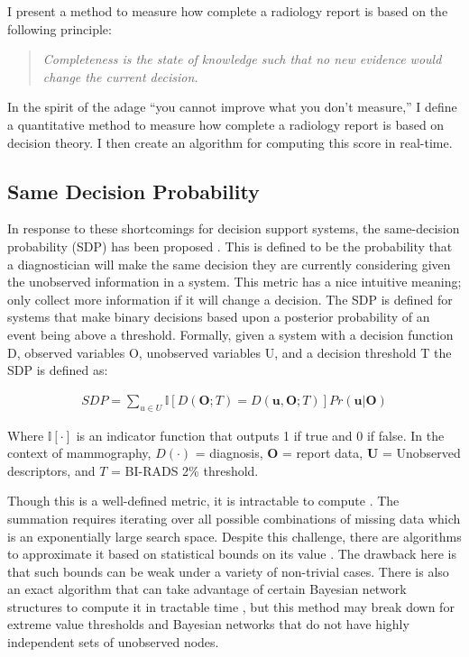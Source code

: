 I present a method to measure how complete a radiology report is based on the following principle:

\begin{quote}
\begin{center}
		\emph{Completeness is the state of knowledge such that no new evidence would change the current decision.}
\end{center}
\end{quote}


In the spirit of the adage ``you cannot improve what you don't measure,'' I define a quantitative method to measure how complete a radiology report is based on decision theory. I then create an algorithm for computing this score in real-time.

\subsection{Same Decision Probability}
In response to these shortcomings for decision support systems, the same-decision probability (SDP) has been proposed \cite{Choi:2012id}. This is defined to be the probability that a diagnostician will make the same decision they are currently considering given the unobserved information in a system. This metric has a nice intuitive meaning; only collect more information if it will change a decision. The SDP is defined for systems that make binary decisions based upon a posterior probability of an event being above a threshold. Formally, given a system with a decision function D, observed variables O, unobserved variables U, and a decision threshold T the SDP is defined as:

\begin{align}
SDP = \sum_{u \in U}\mathbb{I}\left[D(\mathbf{O};T) = D(\mathbf{u},\mathbf{O};T)\right]Pr(\mathbf{u}|\mathbf{O})
\end{align}

Where $\mathbb{I}[\cdotp]$ is an indicator function that outputs 1 if true and 0 if false. 
In the context of mammography, $D(\cdotp)$ = diagnosis, $\mathbf{O}$ = report data, $\mathbf{U}$ = Unobserved descriptors, and $T$ = BI-RADS 2\% threshold.

Though this is a well-defined metric, it is intractable to compute \cite{Chen:2013tw}. The summation requires iterating over all possible combinations of missing data which is an exponentially large search space. Despite this challenge, there are algorithms to approximate it based on statistical bounds on its value \cite{Choi:2012id}. The drawback here is that such bounds can be weak under a variety of non-trivial cases. There is also an exact algorithm that can take advantage of certain Bayesian network structures to compute it in tractable time \cite{Chen:2013tw}, but this method may break down for extreme value thresholds and Bayesian networks that do not have highly independent sets of unobserved nodes.

